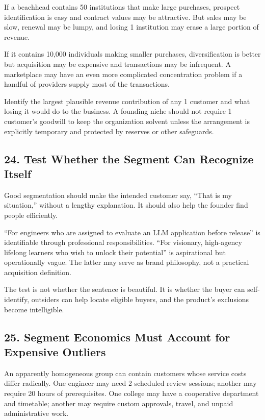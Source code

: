 If a beachhead contains 50 institutions that make large purchases, prospect identification is easy and contract values may be attractive. But sales may be slow, renewal may be lumpy, and losing 1 institution may erase a large portion of revenue.

If it contains 10,000 individuals making smaller purchases, diversification is better but acquisition may be expensive and transactions may be infrequent. A marketplace may have an even more complicated concentration problem if a handful of providers supply most of the transactions.

Identify the largest plausible revenue contribution of any 1 customer and what losing it would do to the business. A founding niche should not require 1 customer's goodwill to keep the organization solvent unless the arrangement is explicitly temporary and protected by reserves or other safeguards.

\subsection*{24. Test Whether the Segment Can Recognize Itself}

Good segmentation should make the intended customer say, ``That is my situation,'' without a lengthy explanation. It should also help the founder find people efficiently.

``For engineers who are assigned to evaluate an LLM application before release'' is identifiable through professional responsibilities. ``For visionary, high-agency lifelong learners who wish to unlock their potential'' is aspirational but operationally vague. The latter may serve as brand philosophy, not a practical acquisition definition.

The test is not whether the sentence is beautiful. It is whether the buyer can self-identify, outsiders can help locate eligible buyers, and the product's exclusions become intelligible.

\subsection*{25. Segment Economics Must Account for Expensive Outliers}

An apparently homogeneous group can contain customers whose service costs differ radically. One engineer may need 2 scheduled review sessions; another may require 20 hours of prerequisites. One college may have a cooperative department and timetable; another may require custom approvals, travel, and unpaid administrative work.

